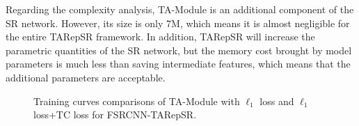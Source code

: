 \documentclass[sn-mathphys]{sn-jnl}%
\theoremstyle{thmstyleone}%
\theoremstyle{thmstyletwo}%
\theoremstyle{thmstylethree}%
\begin{document}
Regarding the complexity analysis, TA-Module is an additional component of the SR network. However, its size is only 7M, which means it is almost negligible for the entire TARepSR framework. In addition, TARepSR will increase the parametric quantities of the SR network, but the memory cost brought by model parameters is much less than saving intermediate features, which means that the additional parameters are acceptable.


\begin{figure}[h!]
\centering
\setlength{\abovecaptionskip}{0.cm}
\caption{Training curves comparisons of TA-Module with $\ell_1$ loss and $\ell_1$ loss+TC loss for FSRCNN-TARepSR.} 
\label{fig:TCloss}  
\end{figure}
\end{document}
